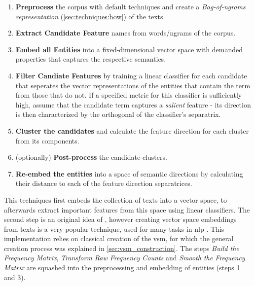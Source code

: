 \label{sec:algorithmsteps}
\begin{enumerate}
	\item[\saveref{sec:algo_preproc}{1.}] \textbf{Preprocess} the corpus with default techniques and create a \textit{Bag-of-ngrams representation} (\ref{sec:techniques:bow}) of the texts.
	\item[\saveref{sec:extract_cands}{2.}] \textbf{Extract Candidate Feature} names from words/\glspl{ngram} of the corpus.
	\item[\saveref{sec:generate_vectorspaces}{3.}] \textbf{Embed all Entities} into a fixed-dimensional vector space with demanded properties that captures the respective semantics.
	\item[\saveref{sec:svm_filter_cands}{4.}] \textbf{Filter Candiate Features} by training a linear classifier for each candidate that seperates the vector representations of the entities that contain the term from those that do not. If a specified metric for this classifier is sufficiently high, assume that the candidate term captures a \textit{salient} feature - its direction is then characterized by the orthogonal of the classifier's separatrix.
	\item[\saveref{sec:algo:cluster}{5.}] \textbf{Cluster the candidates} and calculate the feature direction for each cluster from its components.
	\item[\saveref{sec:algo:postprocess}{6.}] (optionally) \textbf{Post-process} the candidate-clusters.
	\item[\saveref{sec:algo:reembed}{7.}] \textbf{Re-embed the entities} into a space of semantic directions by calculating their distance to each of the feature direction separatrices.	
\end{enumerate}


This techniques first embeds the collection of texts into a  vector space, to afterwards extract important features from this space using linear classifiers. The second step is an original idea of \cite{Derrac2015}, however creating vector space embeddings from texts is a very popular technique, used for many tasks in \gls{nlp} \cite{Mikolov:Regularities,Mikolov2013a,Guo,Lowe,Turney2010}. This implementation relies on classical creation of the \gls{vsm}, for which the general creation process was explained in \autoref{sec:vsm_construction}. The steps \textit{Build the Frequency Matrix}, \textit{Transform Raw Frequency Counts} and \textit{Smooth the Frequency Matrix} are squashed into the preprocessing and embedding of entities (steps 1 and 3).

